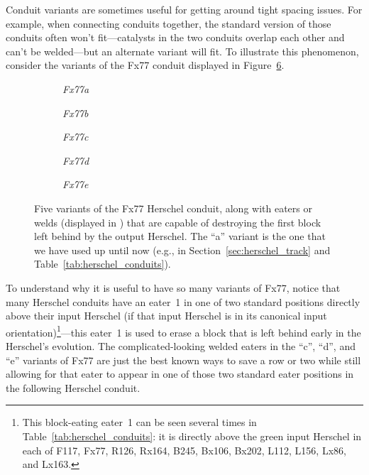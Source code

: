 Conduit variants are sometimes useful for getting around tight spacing issues. For example, when connecting conduits together, the standard version of those conduits often won't fit---catalysts in the two conduits overlap each other and can't be welded---but an alternate variant will fit. To illustrate this phenomenon, consider the variants of the Fx77 conduit displayed in Figure~\ref{fig:fx77_variants}.

\begin{figure}[!htb]
	\centering
	\begin{subfigure}{.18\textwidth}
		\centering
		\caption{\emph{Fx77a}}
		\label{fig:fx77_a}
	\end{subfigure}\quad%
	\begin{subfigure}{.18\textwidth}
		\centering
		\caption{\emph{Fx77b}}
		\label{fig:fx77_b}
	\end{subfigure}\quad%
	\begin{subfigure}{.18\textwidth}
		\centering
		\caption{\emph{Fx77c}}
		\label{fig:fx77_c}
	\end{subfigure}\quad%
	\begin{subfigure}{.18\textwidth}
		\centering
		\caption{\emph{Fx77d}}
		\label{fig:fx77_d}
	\end{subfigure}\quad%
	\begin{subfigure}{.18\textwidth}
		\centering
		\caption{\emph{Fx77e}}
		\label{fig:fx77_e}
	\end{subfigure}
	\caption{Five variants of the Fx77 Herschel conduit, along with eaters or welds (displayed in ) that are capable of destroying the first block left behind by the output Herschel. The ``a'' variant is the one that we have used up until now (e.g., in Section~\ref{sec:herschel_track} and Table~\ref{tab:herschel_conduits}).}\label{fig:fx77_variants}
\end{figure}

To understand why it is useful to have so many variants of Fx77, notice that many Herschel conduits have an eater~1 in one of two standard positions directly above their input Herschel (if that input Herschel is in its canonical input orientation)\footnote{This block-eating eater~1 can be seen several times in Table~\ref{tab:herschel_conduits}: it is directly above the green input Herschel in each of F117, Fx77, R126, Rx164, B245, Bx106, Bx202, L112, L156, Lx86, and Lx163.}---this eater~1 is used to erase a block that is left behind early in the Herschel's evolution. The complicated-looking welded eaters in the ``c'', ``d'', and ``e'' variants of Fx77 are just the best known ways to save a row or two while still allowing for that eater to appear in one of those two standard eater positions in the following Herschel conduit.

